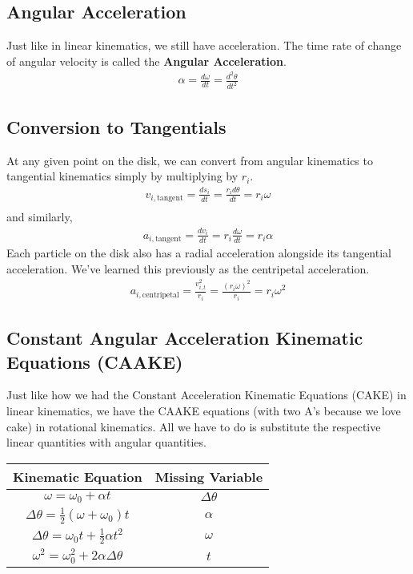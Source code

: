 \documentclass[11pt]{article}
\begin{document}
\subsection{Angular Acceleration}

Just like in linear kinematics, we still have acceleration. The time rate of change of angular velocity is called the \textbf{Angular Acceleration}.
\begin{align*}
    \alpha = \frac{d\omega}{dt} = \frac{d^2 \theta}{dt^2}
\end{align*}

\subsection{Conversion to Tangentials}

At any given point on the disk, we can convert from angular kinematics to tangential kinematics simply by multiplying by $r_i$. 
\begin{align*}
    v_{i,\text{tangent}} = \frac{ds_i}{dt} = \frac{r_i d\theta}{dt} = r_i \omega \\
\end{align*}
and similarly,
\begin{align*}
    a_{i,\text{tangent}} = \frac{dv_i}{dt} = r_i\frac{d\omega}{dt} = r_i \alpha
\end{align*}
Each particle on the disk also has a radial acceleration alongside its tangential acceleration. We've learned this previously as the centripetal acceleration.
\begin{align}
    a_{i,\text{centripetal}} = \frac{v_{i,t}^{2}}{r_i} = \frac{(r_i \omega)^2}{r_i} = r_i \omega^2
\end{align}

\subsection{Constant Angular Acceleration Kinematic Equations (CAAKE)}

Just like how we had the Constant Acceleration Kinematic Equations (CAKE) in linear kinematics, we have the CAAKE equations (with two A's because we love cake) in rotational kinematics. All we have to do is substitute the respective linear quantities with angular quantities.

\begin{table}[H]
    \centering
    \begin{tabular}{c|c}
        Kinematic Equation & Missing Variable \\
        \hline
        $\omega = \omega_{0} + \alpha t$ & $\Delta \theta$ \\
        $\Delta \theta = \frac{1}{2}(\omega + \omega_{0})t$ & $\alpha$ \\
        $\Delta \theta = \omega_{0}t + \frac{1}{2}\alpha t^{2}$ & $\omega$ \\
        $\omega^{2} = \omega_{0}^{2} + 2\alpha\Delta \theta$ & $t$ \\
    \end{tabular}
\end{table}
\end{document}
